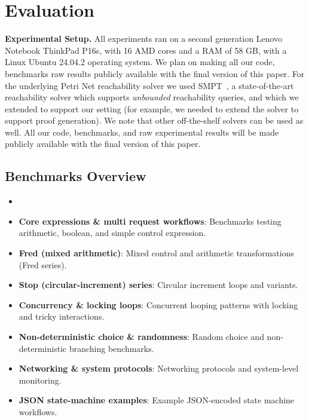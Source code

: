 \section{Evaluation}
\label{sec:evaluation}



\noindent
\textbf{Experimental Setup.}
All experiments ran on a second generation Lenovo Notebook ThinkPad P16s, with 16 AMD cores and a RAM of 58 GB, with a Linux Ubuntu 24.04.2 operating system.
%
We plan on making all our code, benchmarks raw results publicly available with the final version of this paper.
%
For the underlying Petri Net reachability solver we used SMPT~\cite{AmDa23}, a state-of-the-art reachability solver which supports \textit{unbounded} reachability queries, and which we extended to support our setting (for example, we needed to extend the solver to support proof generation). 
%
We note that other off-the-shelf solvers can be used as well.
%
All our code, benchmarks, and raw experimental results will be made publicly available with the final version of this paper.
 


\subsection{Benchmarks Overview} 
\label{subsec:benchmarks}

\begin{itemize}
	
	\item {}
	\item \textbf{Core expressions \& multi request workflows}: Benchmarks testing arithmetic, boolean, and simple control expression.
	\item \textbf{Fred (mixed arithmetic)}: Mixed control and arithmetic transformations (Fred series).
	\item \textbf{Stop (circular-increment) series}: Circular increment loops and variants.
	\item \textbf{Concurrency \& locking loops}: Concurrent looping patterns with locking and tricky interactions.
	\item \textbf{Non-deterministic choice \& randomness}: Random choice and non-deterministic branching benchmarks.
	\item \textbf{Networking \& system protocols}: Networking protocols and system-level monitoring.
	\item \textbf{JSON state-machine examples}: Example JSON-encoded state machine workflows.
\end{itemize}



